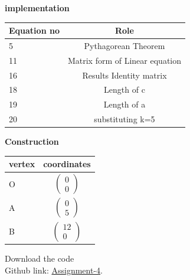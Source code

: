 \documentclass[10pt,a4paper]{report}
\begin{document}
\begin{multicols}{2}
\textbf{implementation}
\begin{center}
\setlength{\arrayrulewidth}{0.5mm}
\setlength{\tabcolsep}{5pt}
\renewcommand{\arraystretch}{3}
    \begin{tabular}{|l|c|}
    \hline 
    \textbf{Equation no} & \textbf{Role} \\ \hline
    5 &  Pythagorean Theorem \\ 
    11 & Matrix form of Linear equation  \\
    16 & Results Identity matrix  \\
    18 & Length of c\\
    19 & Length of a \\
    20 & substituting k=5\\
    \hline
      \end{tabular}
  \end{center} \vspace{2mm}
  
 \vspace{2mm} \textbf{Construction}
\begin{center}
\setlength{\arrayrulewidth}{0.5mm}
\setlength{\tabcolsep}{6pt}
\renewcommand{\arraystretch}{1.5}
    \begin{tabular}{|l|c|}
    \hline 
    \textbf{vertex} & \textbf{coordinates} \\ \hline
   O & $ \begin{pmatrix} 
0 \\
0
\end{pmatrix} $ \\ \hline
    A & $\begin{pmatrix}
0 \\
5
\end{pmatrix}$   \\\hline
    B & $\begin{pmatrix}
12 \\
0
\end{pmatrix} $\\
    \hline
      \end{tabular}
  \end{center}
  
\raggedright  Download the code \\
Github link: \href{https://github.com/chiragshah1244/FWC/blob/main/assignments/assignment-1/code/src/seq.cpp}{Assignment-4}.
  \end{multicols}
\end{document}
